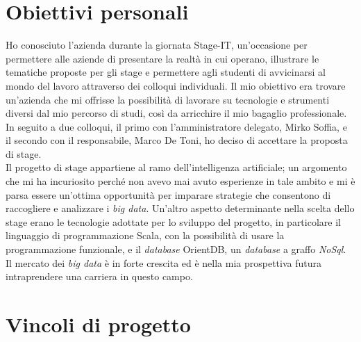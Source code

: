 \section{Obiettivi personali}
Ho conosciuto l'azienda durante la giornata Stage-IT, un'occasione per permettere alle aziende di presentare la realtà in cui operano, illustrare le tematiche proposte per gli stage e permettere agli studenti di avvicinarsi al mondo del lavoro attraverso dei colloqui individuali. Il mio obiettivo era trovare un'azienda che mi offrisse la possibilità di lavorare su tecnologie e strumenti diversi dal mio percorso di studi, così da arricchire il mio bagaglio professionale. In seguito a due colloqui, il primo con l'amministratore delegato, Mirko Soffia, e il secondo con il responsabile, Marco De Toni, ho deciso di accettare la proposta di stage.\\
Il progetto di stage appartiene al ramo dell'intelligenza artificiale; un argomento che mi ha incuriosito perché non avevo mai avuto esperienze in tale ambito e mi è parsa essere un'ottima opportunità per imparare strategie che consentono di raccogliere e analizzare i \textit{big data}. Un'altro aspetto determinante nella scelta dello stage erano le tecnologie adottate per lo sviluppo del progetto, in particolare il linguaggio di programmazione Scala, con la possibilità di usare la programmazione funzionale, e il \textit{database} OrientDB, un \textit{database} a graffo \textit{NoSql}. \\
Il mercato dei \textit{big data} è in forte crescita ed è nella mia prospettiva futura intraprendere una carriera in questo campo.

\section{Vincoli di progetto}

